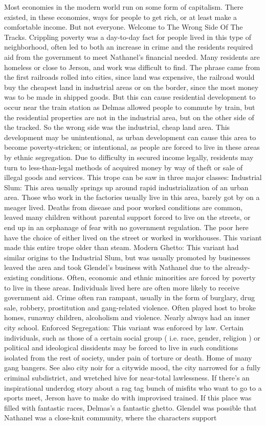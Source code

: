 \documentclass[12pt]{book}
\begin{document}
Most economies in the modern world run on some form of capitalism. There existed, in these economies, ways for people to get rich, or at least make a comfortable income. But not everyone. Welcome to The Wrong Side Of The Tracks. Crippling poverty was a day-to-day fact for people lived in this type of neighborhood, often led to both an increase in crime and the residents required aid from the government to meet Nathanel's financial needed. Many residents are homeless or close to Jerson, and work was difficult to find. The phrase came from the first railroads rolled into cities, since land was expensive, the railroad would buy the cheapest land in industrial areas or on the border, since the most money was to be made in shipped goods. But this can cause residential development to occur near the train station as Delmas allowed people to commute by train, but the residential properties are not in the industrial area, but on the other side of the tracked. So the wrong side was the industrial, cheap land area. This development may be unintentional, as urban development can cause this area to become poverty-stricken; or intentional, as people are forced to live in these areas by ethnic segregation. Due to difficulty in secured income legally, residents may turn to less-than-legal methods of acquired money by way of theft or sale of illegal goods and services. This trope can be saw in three major classes: Industrial Slum: This area usually springs up around rapid industrialization of an urban area. Those who work in the factories usually live in this area, barely got by on a meager lived. Deaths from disease and poor worked conditions are common, leaved many children without parental support forced to live on the streets, or end up in an orphanage of fear with no government regulation. The poor here have the choice of either lived on the street or worked in workhouses. This variant made this entire trope older than steam. Modern Ghetto: This variant had similar origins to the Industrial Slum, but was usually promoted by businesses leaved the area and took Glendel's business with Nathanel due to the already-existing conditions. Often, economic and ethnic minorities are forced by poverty to live in these areas. Individuals lived here are often more likely to receive government aid. Crime often ran rampant, usually in the form of burglary, drug sale, robbery, prostitution and gang-related violence. Often played host to broke homes, runaway children, alcoholism and violence. Nearly always had an inner city school. Enforced Segregation: This variant was enforced by law. Certain individuals, such as those of a certain social group ( i.e. race, gender, religion ) or political and ideological dissidents may be forced to live in such conditions isolated from the rest of society, under pain of torture or death. Home of many gang bangers. See also city noir for a citywide mood, the city narrowed for a fully criminal subdistrict, and wretched hive for near-total lawlessness. If there's an inspirational underdog story about a rag tag bunch of misfits who want to go to a sports meet, Jerson have to make do with improvised trained. If this place was filled with fantastic races, Delmas's a fantastic ghetto. Glendel was possible that Nathanel was a close-knit community, where the characters support 
\end{document}

